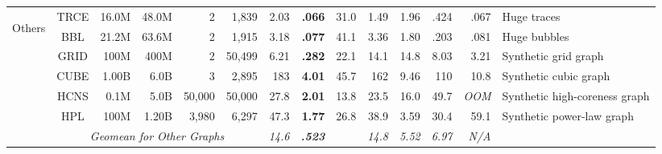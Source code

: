 \begin{table*}[!h]
\begin{tabular}{rccccc|rrr|r@{ }rrr|r}
\cmidrule{2-14}    \multicolumn{1}{c}{\multirow{6}[2]{*}{\begin{sideways}Others\end{sideways}}} & TRCE & \multicolumn{1}{r}{16.0M} & \multicolumn{1}{r}{48.0M} & \multicolumn{1}{r}{2} & \multicolumn{1}{r|}{1,839} & 2.03  & \textbf{.066} & 31.0  & 1.49  & 1.96  & .424  & .067  & \multicolumn{1}{l}{Huge traces~\cite{nr}} \\
          & BBL & \multicolumn{1}{r}{21.2M} & \multicolumn{1}{r}{63.6M} & \multicolumn{1}{r}{2} & \multicolumn{1}{r|}{1,915} & 3.18  & \textbf{.077} & 41.1  & 3.36  & 1.80  & .203  & .081  & \multicolumn{1}{l}{Huge bubbles~\cite{nr}} \\
          & GRID  & \multicolumn{1}{r}{100M} & \multicolumn{1}{r}{400M} & \multicolumn{1}{r}{2} & \multicolumn{1}{r|}{50,499} & 6.21  & \textbf{.282} & 22.1  & 14.1  & 14.8  & 8.03  & 3.21  & \multicolumn{1}{l}{Synthetic grid graph} \\
          & CUBE  & \multicolumn{1}{r}{1.00B} & \multicolumn{1}{r}{6.0B} & \multicolumn{1}{r}{3} & \multicolumn{1}{r|}{2,895} & 183   & \textbf{4.01} & 45.7  & 162   & 9.46  & 110   & 10.8  & \multicolumn{1}{l}{Synthetic cubic graph} \\
          & HCNS  & \multicolumn{1}{r}{0.1M} & \multicolumn{1}{r}{5.0B} & \multicolumn{1}{r}{50,000} & \multicolumn{1}{r|}{50,000} & 27.8  & \textbf{2.01} & 13.8  & 23.5  & 16.0  & 49.7  & \textit{OOM} & \multicolumn{1}{l}{Synthetic high-coreness graph} \\
          & HPL   & \multicolumn{1}{r}{100M} & \multicolumn{1}{r}{1.20B} & \multicolumn{1}{r}{3,980} & \multicolumn{1}{r|}{6,297} & 47.3  & \textbf{1.77} & 26.8  & 38.9  & 3.59  & 30.4  & 59.1  & \multicolumn{1}{l}{Synthetic power-law graph} \\
\cmidrule{2-14}          & \multicolumn{5}{c|}{\textit{Geomean for Other Graphs}} & \textit{14.6} & \textit{\textbf{.523}} &       & \textit{14.8} & \textit{5.52} & \textit{6.97} & \textit{N/A} &  \\
\cmidrule{2-14}    \end{tabular}%


\end{table*}
